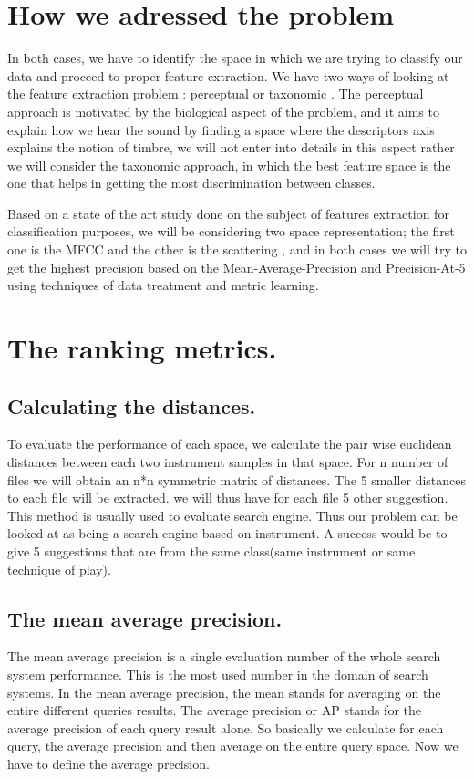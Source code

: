 \documentclass[hidelinks,12pt]{report}
\begin{document}
\section{How we adressed the problem}
In both cases, we have to identify the space in which we are trying to classify our data and proceed to proper feature extraction. We have two ways of looking at the feature extraction problem : perceptual or taxonomic \cite{P03}. The perceptual approach is motivated by the biological aspect of the problem, and it aims to explain how we hear the sound by finding a space where the descriptors axis explains the notion of timbre, we will not enter into details in this aspect rather we will consider the taxonomic approach, in which the best feature space is the one that helps in getting the most discrimination between classes.\par
Based on a state of the art study done on the subject of features extraction for classification purposes, we will be considering two space representation; the first one is the MFCC and the other is the scattering \cite{AM11}, and in both cases we will try to get the highest precision based on the Mean-Average-Precision and Precision-At-5 using techniques of data treatment and metric learning. 

\section{The ranking metrics.}
\subsection{Calculating the distances.}
To evaluate the performance of each space, we calculate the pair wise euclidean distances between each two instrument samples in that space. For n number of files we will obtain an n*n symmetric matrix of distances. The 5 smaller distances to each file  will be extracted. we will thus have for each file 5 other suggestion. This method is usually used to evaluate search engine. Thus our problem can be looked at as being a search engine based on instrument. A success would be to give 5 suggestions that are from the same class(same instrument or same technique of play).
\subsection{The mean average precision.}
The mean average precision is a single evaluation number of the whole search system performance. This is the most used number in the domain of search systems. In the mean average precision, the mean stands for averaging on the entire different queries results. The average precision or AP stands for the average precision of each query result alone. So basically we calculate for each query, the average precision and then average on the entire query space. Now we have to define the average precision.
\end{document}
